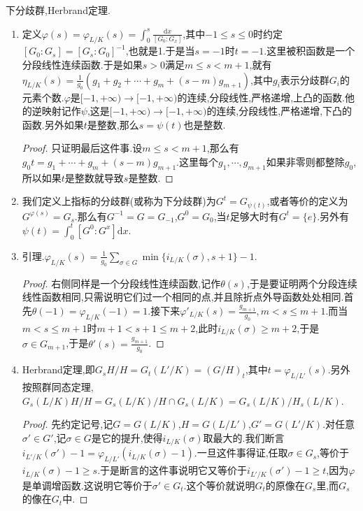 下分歧群,Herbrand定理.
\begin{enumerate}
	\item 定义$\varphi(s)=\varphi_{L/K}(s)=\int_0^s\frac{\mathrm{d}x}{[G_0:G_x]}$,其中$-1\le s\le0$时约定$[G_0:G_s]=[G_s:G_0]^{-1}$,也就是1.于是当$s=-1$时$t=-1$.这里被积函数是一个分段线性连续函数.于是如果$s>0$满足$m\le s<m+1$,就有$\eta_{L/K}(s)=\frac{1}{g_0}\left(g_1+g_2+\cdots+g_m+(s-m)g_{m+1}\right)$,其中$g_i$表示分歧群$G_i$的元素个数.$\varphi$是$[-1,+\infty)\to[-1,+\infty)$的连续,分段线性,严格递增,上凸的函数.他的逆映射记作$\psi$,这是$[-1,+\infty)\to[-1,+\infty)$的连续,分段线性,严格递增,下凸的函数.另外如果$t$是整数,那么$s=\psi(t)$也是整数.
	\begin{proof}
		
		只证明最后这件事.设$m\le s<m+1$,那么有$g_0t=g_1+\cdots+g_m+(s-m)g_{m+1}$.这里每个$g_1,\cdots,g_{m+1}$如果非零则都整除$g_0$,所以如果$t$是整数就导致$s$是整数.
	\end{proof}
	\item 我们定义上指标的分歧群(或称为下分歧群)为$G^t=G_{\psi(t)}$,或者等价的定义为$G^{\varphi(s)}=G_s$.那么有$G^{-1}=G=G_{-1}$,$G^0=G_0$,当$t$足够大时有$G^t=\{e\}$.另外有$\psi(t)=\int_0^t[G^0:G^x]\mathrm{d}x$.
	\item 引理.$\varphi_{L/K}(s)=\frac{1}{g_0}\sum_{\sigma\in G}\min\{i_{L/K}(\sigma),s+1\}-1$.
	\begin{proof}
		
		右侧同样是一个分段线性连续函数,记作$\theta(s)$,于是要证明两个分段连续线性函数相同,只需说明它们过一个相同的点,并且除折点外导函数处处相同.首先$\theta(-1)=\varphi_{L/K}(-1)=1$.接下来$\varphi'_{L/K}(s)=\frac{g_{m+1}}{g_0},m<s\le m+1$.而当$m<s\le m+1$时$m+1<s+1\le m+2$,此时$i_{L/K}(\sigma)\ge m+2$,于是$\sigma\in G_{m+1}$,于是$\theta'(s)=\frac{g_{m+1}}{g_0}$.
	\end{proof}
	\item Herbrand定理,即$G_sH/H=G_t(L'/K)=(G/H)_t$,其中$t=\varphi_{L/L'}(s)$.另外按照群同态定理,$G_s(L/K)H/H=G_s(L/K)/H\cap G_s(L/K)=G_s(L/K)/H_s(L/K)$.
	\begin{proof}
		
		先约定记号,记$G=G(L/K)$,$H=G(L/L')$,$G'=G(L'/K)$.对任意$\sigma'\in G'$,记$\sigma\in G$是它的提升,使得$i_{L/K}(\sigma)$取最大的.我们断言$i_{L'/K}(\sigma')-1=\varphi_{L/L'}(i_{L/K}(\sigma)-1)$.一旦这件事得证,任取$\sigma\in G_s$,等价于$i_{L/K}(\sigma)-1\ge s$.于是断言的这件事说明它又等价于$i_{L'/K}(\sigma')-1\ge t$,因为$\varphi$是单调增函数.这说明它等价于$\sigma'\in G_t$.这个等价就说明$G_t$的原像在$G_s$里,而$G_s$的像在$G_t$中.
		

\end{proof}
\end{enumerate}
